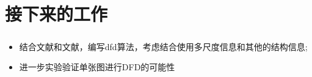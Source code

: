\documentclass[UTF8]{ctexart}
\newcommand{\myciteup}[1]{\textsuperscript{\textsuperscript{\cite{#1}}}}
\begin{document}
\begin{sloppypar}
        \section{接下来的工作}
        \begin{itemize}
            \item 结合文献\myciteup{rajagopalan1999mrf}和文献\myciteup{saxena2005learning}，编写dfd算法，考虑结合使用多尺度信息和其他的结构信息;
            \item 进一步实验验证单张图进行DFD的可能性
        \end{itemize}


    
    
    \end{sloppypar}
\end{document}
